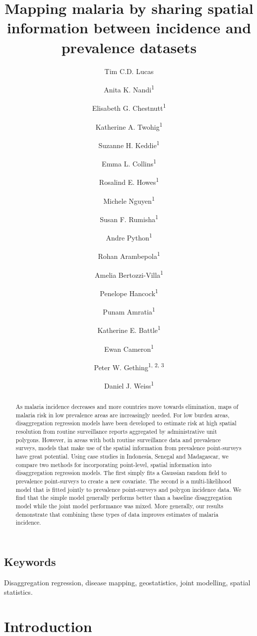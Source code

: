 \documentclass{statsoc}
\title[Mapping malaria by sharing spatial information]{Mapping malaria by sharing spatial information between incidence and prevalence datasets}
\author[Tim C.D. Lucas {\it et al.}]{Tim C.D. Lucas}
\author{Anita K. Nandi\textsuperscript{1}}
\author{Elisabeth G. Chestnutt\textsuperscript{1}}
\author{Katherine A. Twohig\textsuperscript{1}}
\author{Suzanne H. Keddie\textsuperscript{1}}
\author{Emma L. Collins\textsuperscript{1}}
\author{Rosalind E. Howes\textsuperscript{1}}
\author{Michele Nguyen\textsuperscript{1}}
\author{Susan F. Rumisha\textsuperscript{1}}
\author{Andre Python\textsuperscript{1}}
\author{Rohan Arambepola\textsuperscript{1}}
\author{Amelia Bertozzi-Villa\textsuperscript{1}}
\author{Penelope Hancock\textsuperscript{1}}
\author{Punam Amratia\textsuperscript{1}}
\author{Katherine E. Battle\textsuperscript{1}}
\author{Ewan Cameron\textsuperscript{1}}
\author{Peter W. Gething\textsuperscript{1, 2, 3}}
\author{Daniel J. Weiss\textsuperscript{1}}
\begin{document}
\begin{abstract}
As malaria incidence decreases and more countries move towards elimination, maps of malaria risk in low prevalence areas are increasingly needed.
For low burden areas, disaggregation regression models have been developed to estimate risk at high spatial resolution from routine surveillance reports aggregated by administrative unit polygons.
However, in areas with both routine surveillance data and prevalence surveys, models that make use of the spatial information from prevalence point-surveys have great potential.
Using case studies in Indonesia, Senegal and Madagascar, we compare two methods for incorporating point-level, spatial information into disaggregation regression models.
The first simply fits a Gaussian random field to prevalence point-surveys to create a new covariate.
The second is a multi-likelihood model that is fitted jointly to prevalence point-surveys and polygon incidence data.
We find that the simple model generally performs better than a baseline disaggregation model while the joint model performance was mixed.
More generally, our results demonstrate that combining these types of data improves estimates of malaria incidence.
\end{abstract}

\subsection{Keywords}
Disaggregation regression, disease mapping, geostatistics, joint modelling, spatial statistics.


\section*{Introduction}


\end{document}
